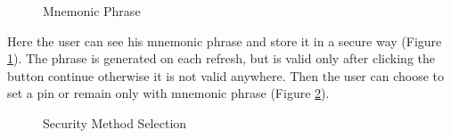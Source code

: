 \begin{figure}[H]
    \centering
    \caption{Mnemonic Phrase}
    \label{mnemonic-phrase}
\end{figure}

Here the user can see his mnemonic phrase and store it in a secure way (Figure \ref{mnemonic-phrase}). The phrase is generated on each refresh, but is valid only after clicking the button continue otherwise it is not valid anywhere. Then the user can choose to set a pin or remain only with mnemonic phrase (Figure \ref{security-method}).

\begin{figure}[H]
    \centering
    \caption{Security Method Selection}
    \label{security-method}
\end{figure}

